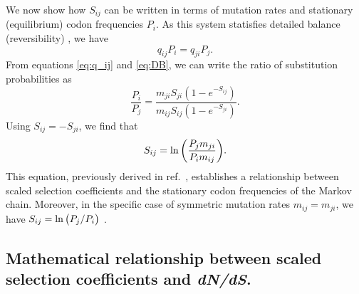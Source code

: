 \documentclass[11pt]{article}
\begin{document}
We now show how $S_{ij}$ can be written in terms of mutation rates and stationary (equilibrium) codon frequencies $P_i$. As this system statisfies detailed balance (reversibility) \cite{HalpernBruno1998}, we have 
\begin{equation}\label{eq:DB}
q_{ij}P_i = q_{ji}P_j .
\end{equation} From equations \eqref{eq:q_ij} and \eqref{eq:DB}, we can write the ratio of substitution probabilities as 
\begin{equation}\label{ratio_q_ij}
\frac{P_i}{P_j} = \frac{m_{ji} S_{ji} (1-e^{-S_{ij}})} {m_{ij} S_{ij} (1-e^{-S_{ji}})} .
\end{equation} Using $S_{ij} = -S_{ji}$, we find that
\begin{equation}\label{eq:s_pmu}
S_{ij} = \ln\bigg{(} \frac{P_jm_{ji}}{P_im_{ij}} \bigg{)} .
\end{equation} This equation, previously derived in ref.\ \cite{HalpernBruno1998}, establishes a relationship between scaled selection coefficients and the stationary codon frequencies of the Markov chain. Moreover, in the specific case of symmetric mutation rates $m_{ij} = m_{ji}$, we have $S_{ij} = \ln\big{(}P_j/P_i\big{)}$ \cite{SellaHirsh2005}. 


		
\subsection*{Mathematical relationship between scaled selection coefficients and \emph{dN/dS}.} 
\end{document}
